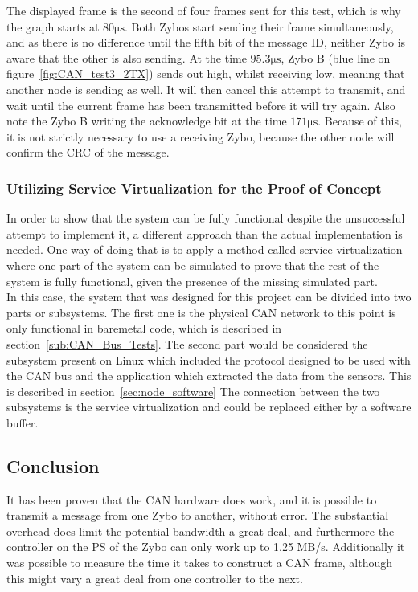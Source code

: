 The displayed frame is the second of four frames sent for this test, which is why the graph starts at $80 \si{\micro\second}$.
Both Zybos start sending their frame simultaneously, and as there is no difference until the fifth bit of the message ID, neither Zybo is aware that the other is also sending.
At the time $95.3\si{\micro\second}$, Zybo B (blue line on figure~\ref{fig:CAN_test3_2TX}) sends out high, whilst receiving low, meaning that another node is sending as well. 
It will then cancel this attempt to transmit, and wait until the current frame has been transmitted before it will try again.
Also note the Zybo B writing the acknowledge bit at the time $171 \si{\micro\second}$.
Because of this, it is not strictly necessary to use a receiving Zybo, because the other node will confirm the CRC of the message.\\

\subsubsection{Utilizing Service Virtualization for the Proof of Concept}
\label{sub:Utilizing_Svr_Virtualization}
In order to show that the system can be fully functional despite the unsuccessful attempt to implement it, a different approach than the actual implementation is needed.
One way of doing that is to apply a method called service virtualization where one part of the system can be simulated to prove that the rest of the system is fully functional, given the presence of the missing simulated part.
\\
In this case, the system that was designed for this project can be divided into two parts or subsystems.
The first one is the physical CAN network to this point is only functional in bare\-metal code, which is described in section~\ref{sub:CAN_Bus_Tests}.
The second part would be considered the subsystem present on Linux which included the protocol designed to be used with the CAN bus and the application which extracted the data from the sensors.
This is described in section~\ref{sec:node_software}
The connection between the two subsystems is the service virtualization and could be replaced either by a software buffer.

\subsection{Conclusion}\label{sub:CAN_test_conclusion}
It has been proven that the CAN hardware does work, and it is possible to transmit a message from one Zybo to another, without error.
The substantial overhead does limit the potential bandwidth a great deal, and furthermore the controller on the PS of the Zybo can only work up to 1.25 MB/s. 
Additionally it was possible to measure the time it takes to construct a CAN frame, although this might vary a great deal from one controller to the next.

